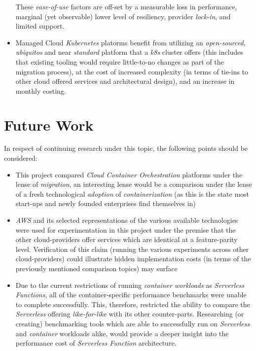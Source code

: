 \begin{itemize}
            These \emph{ease-of-use} factors are off-set by a measurable loss in performance, marginal (yet observable) lower level of resiliency, provider \textit{lock-in},
            and limited support.
      \item Managed Cloud \textit{Kubernetes} platorms benefit from utilizing an \textit{open-sourced}, \emph{ubiquitos} and near \textit{standard} platform
            that a \textit{k8s} cluster offers (this includes that existing tooling would require little-to-no changes as part of the migration process),
            at the cost of increased complexity (in terms of tie-ins to other cloud offered services and architectural design),
            and an increase in monthly costing.
\end{itemize}

\chapter{Future Work}
In respect of continuing research under this topic, the following points should be considered:
\begin{itemize}
      \item This project compared \emph{Cloud Container Orchestration} platforms under the lense of \emph{migration},
            an interesting lense would be a comparison under the lense of a fresh technological \emph{adoption} of \textit{containerization}
            (as this is the state most start-ups and newly founded enterprises find themselves in)
      \item \textit{AWS} and its selected representations of the various available technologies were used for experimentation in this project
            under the premise that the other cloud-providers offer services which are identical at a feature-parity level.
            Verification of this claim (running the various experiments across other cloud-providers) could illustrate hidden implementation costs
            (in terms of the previously mentioned comparison topics) may surface
      \item Due to the current restrictions of running \textit{container workloads} as \textit{Serverless Functions},
            all of the container-specific performance benchmarks were unable to complete successfully.
            This, therefore, restricted the ability to compare the \textit{Serverless} offering \emph{like-for-like} with its other counter-parts.
            Researching (or creating) benchmarking tools which are able to successfully run on \textit{Serverless} and \textit{container} workloads alike,
            would provide a deeper insight into the performance cost of \textit{Serverless Function} architecture.
\end{itemize}
